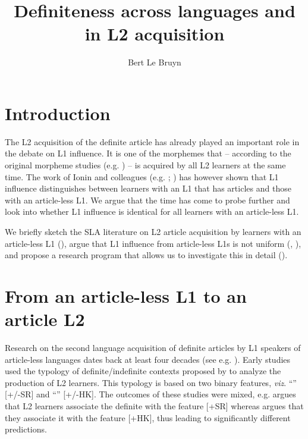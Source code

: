 \documentclass[output=paper,
modfonts
]{langscibook}
\title{Definiteness across languages and in L2 acquisition}
\author{%
Bert Le Bruyn\affiliation{Utrecht Institute of Linguistics OTS}
}
\begin{document}
\maketitle

\section{Introduction}
The L2 acquisition of the definite article has already played an important role in the debate on L1 influence. It is one of the morphemes that -- according to the original morpheme studies (e.g. \citealt{DulayBurt1974}) -- is acquired by all L2 learners at the same time. The work of Ionin and colleagues (e.g. \citealt{IoninKoWexler2004}; \citealt{IoninMontrul2010}) has however shown that L1 influence distinguishes between learners with an L1 that has articles and those with an article-less L1. We argue that the time has come to probe further and look into whether L1 influence is identical for all learners with an article-less L1. 

We briefly sketch the SLA literature on L2 article acquisition by learners with an article-less L1 (), argue that L1 influence from article-less L1s is not uniform \largerpage (, ), and propose a research program that allows us to investigate this in detail ().

\section{From an article-less L1 to an article L2}\label{sec:lebruyn:2}

Research on the second language acquisition of definite articles by L1 speakers of article-less languages dates back at least four decades (see e.g. \citealt{Hakuta1976}). Early studies \citep{Huebner1983,TaroneParrish1988,Thomas1989} used the typology of definite/indefinite contexts proposed by \citet{Bickerton1981} to analyze the production of L2 learners. This typology is based on two binary features, \textit{viz}. ``'' [+/-SR] and ``'' [+/-HK]. The outcomes of these studies were mixed, e.g. \citet{Thomas1989} argues that L2 learners associate the definite with the feature [+SR] whereas \citet{Master1987} argues that they associate it with the feature [+HK], thus leading to significantly different predictions.
\end{document}
